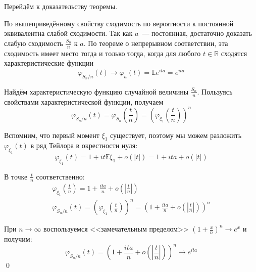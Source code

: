 \documentclass[oneside,final,14pt]{extreport}
\renewenvironment{proof}{{\bfseries Доказательство.}}{\qed}
\theoremstyle{definition}
\begin{document}
Перейдём к доказательству теоремы.

\begin{proof}
    По вышеприведённому свойству сходимость по вероятности к постоянной эквивалентна слабой сходимости. Так как $a$~--- постоянная, достаточно доказать слабую сходимость $\frac{S_{n}}{n}$ к $a$. По теореме о непрерывном соответствии, эта сходимость имеет место тогда и только тогда, когда для любого $t \in \mathbb{R}$ сходятся характеристические функции
    \begin{equation*}
        \varphi_{S_{n} / n}(t) \rightarrow \varphi_{a}(t)=\mathbb{E} e^{i t a}=e^{i t a}
    \end{equation*}
    
    Найдём характеристическую функцию случайной величины $\frac{S_{n}}{n}$. Пользуясь свойствами характеристической функции, получаем
    \begin{equation*}
        \varphi_{S_{n} / n}(t)=\varphi_{S_{n}}\left(\frac{t}{n}\right)=\left(\varphi_{\xi_{1}}\left(\frac{t}{n}\right)\right)^{n}
    \end{equation*}
    
    Вспомним, что первый момент $\xi_{1}$ существует, поэтому мы можем разложить $\varphi_{\xi_{1}}(t)$ в ряд Тейлора в окрестности нуля:
    \begin{equation*}
        \varphi_{\xi_{1}}(t)=1+i t \mathbb{E} \xi_{1}+o(|t|)=1+i t a+o(|t|)
    \end{equation*}
    
    В точке $\frac{t}{n}$ соответственно:
    \begin{gather*}
        \varphi_{\xi_{1}}\left(\frac{t}{n}\right)=1+\frac{i t a}{n}+o\left(\left|\frac{t}{n}\right|\right) \\
        \varphi_{S_{n} / n}(t)=\left(\varphi_{\xi_{1}}\left(\frac{t}{n}\right)\right)^{n}=\left(1+\frac{i t a}{n}+o\left(\left|\frac{t}{n}\right|\right)\right)^{n}
    \end{gather*}
    
    При $n \rightarrow \infty$ воспользуемся <<замечательным пределом>> $\left(1+\frac{x}{n}\right)^{n} \rightarrow e^{x}$ и получим:
    \begin{equation*}
        \varphi_{S_{n} / n}(t)=\left(1+\frac{i t a}{n}+o\left(\left|\frac{t}{n}\right|\right)\right)^{n} \rightarrow e^{i t a}
    \end{equation*}
\end{proof}
\end{document}
